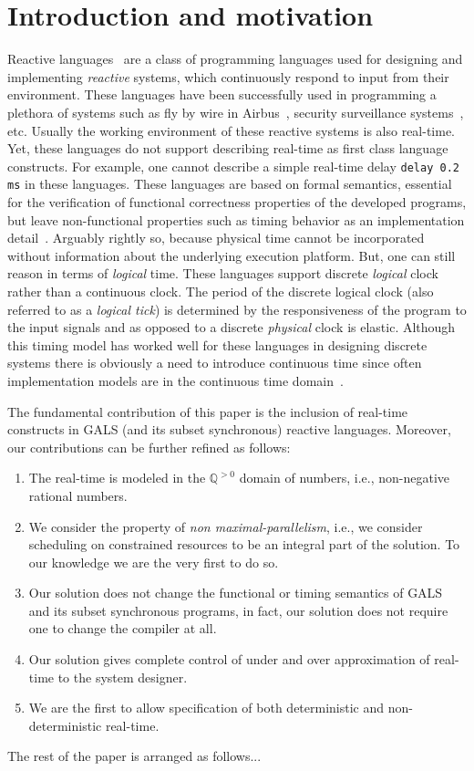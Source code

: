 \section{Introduction and motivation}
\label{sec:intr-motiv}

Reactive languages~\cite{gber05,amal10} are a class of programming
languages used for designing and implementing \textit{reactive} systems,
which continuously respond to input from their environment. These
languages have been successfully used in programming a plethora of
systems such as fly by wire in Airbus~\cite{eairbus}, security
surveillance systems~\cite{amal121}, etc. Usually the working
environment of these reactive systems is also real-time. Yet, these
languages do not support describing real-time as first class language
constructs. For example, one cannot describe a simple real-time delay
\texttt{delay 0.2 ms} in these languages. These languages are based on
formal semantics, essential for the verification of functional
correctness properties of the developed programs, but leave
non-functional properties such as timing behavior as an implementation
detail~\cite{ringler00,boldt07}. Arguably rightly so, because physical
time cannot be incorporated without information about the underlying
execution platform. But, one can still reason in terms of
\textit{logical} time. These languages support discrete \textit{logical}
clock rather than a continuous clock. The period of the discrete logical
clock (also referred to as a \textit{logical tick}) is determined by the
responsiveness of the program to the input signals and as opposed to a
discrete \textit{physical} clock is elastic. Although this timing model
has worked well for these languages in designing discrete systems there
is obviously a need to introduce continuous time since often
implementation models are in the continuous time
domain~\cite{DBLP:journals/pieee/SifakisTY03}.



The fundamental contribution of this paper is the inclusion of real-time
constructs in GALS (and its subset synchronous) reactive
languages. Moreover, our contributions can be further refined as
follows:

\begin{enumerate}
\item The real-time is modeled in the $\mathbb{Q}^{>0}$ domain of
  numbers, i.e., non-negative rational numbers.
\item We consider the property of \textit{non maximal-parallelism},
  i.e., we consider scheduling on constrained resources to be an
  integral part of the solution. To our knowledge we are the very first
  to do so.
\item Our solution does not change the functional or timing semantics of
  GALS and its subset synchronous programs, in fact, our solution does
  not require one to change the compiler at all.
\item Our solution gives complete control of under and over
  approximation of real-time to the system designer.
\item We are the first to allow specification of both deterministic and
  non-deterministic real-time.
\end{enumerate}

The rest of the paper is arranged as follows...



